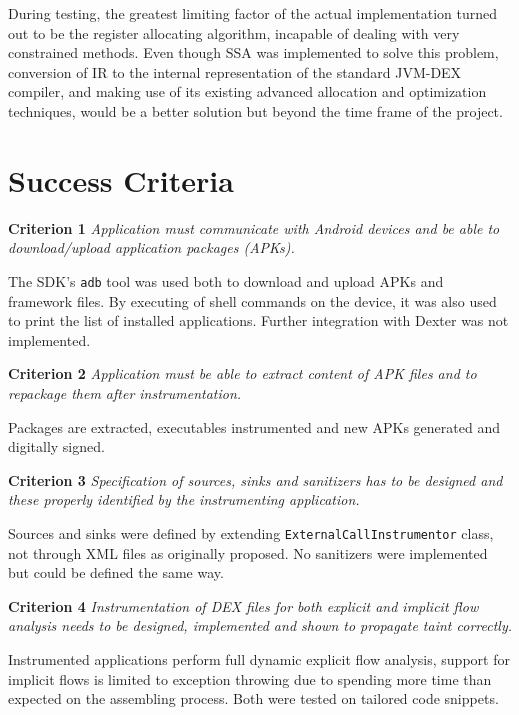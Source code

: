 \documentclass[12pt,twoside,notitlepage]{report}
\begin{document}
During testing, the greatest limiting factor of the actual implementation turned out to be the register allocating algorithm, incapable of dealing with very constrained methods. Even though SSA was implemented to solve this problem, conversion of IR to the internal representation of the standard JVM-DEX compiler, and making use of its existing advanced allocation and optimization techniques, would be a better solution but beyond the time frame of the project.

\section{Success Criteria}

\begin{description}
	\item \textbf{Criterion 1} \emph{Application must communicate with Android devices and be able to download/upload application packages (APKs).}

	The SDK's \verb$adb$ tool was used both to download and upload APKs and framework files. By executing of shell commands on the device, it was also used to print the list of installed applications. Further integration with Dexter was not implemented.

	\item \textbf{Criterion 2} \emph{Application must be able to extract content of APK files and to repackage them after instrumentation.}

	Packages are extracted, executables instrumented and new APKs generated and digitally signed.

	\item \textbf{Criterion 3} \emph{Specification of sources, sinks and sanitizers has to be designed and these properly identified by the instrumenting application.}

	Sources and sinks were defined by extending \verb$ExternalCallInstrumentor$ class, not through XML files as originally proposed. No sanitizers were implemented but could be defined the same way.

	\item \textbf{Criterion 4} \emph{Instrumentation of DEX files for both explicit and implicit flow analysis needs to be designed, implemented and shown to propagate taint correctly.}

	Instrumented applications perform full dynamic explicit flow analysis, support for implicit flows is limited to exception throwing due to spending more time than expected on the assembling process. Both were tested on tailored code snippets.


\end{description}
\end{document}
